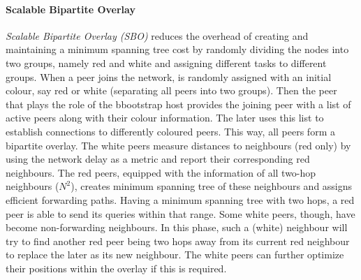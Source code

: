 %
%
%

\paragraph*{\bf Scalable Bipartite Overlay}
\emph{Scalable Bipartite Overlay (SBO)}
\cite{liu_bipartite_IPDPS,liu_bipartite_2007} reduces the overhead of
creating and maintaining a minimum spanning tree cost by randomly dividing the
nodes into two groups, namely red and white and assigning different tasks to
different groups. When a peer joins the network, is randomly assigned with an
initial colour, say red or white (separating all peers into two groups). Then
the peer that plays the role of the bbootstrap host provides the joining peer
with a list of active peers along with their colour information. The later uses
this list to establish connections to differently coloured peers. This way, all
peers form a bipartite overlay. The white peers measure distances to
neighbours (red only) by using the network delay as a metric and report their
corresponding red neighbours. The red peers, equipped with the information of
all two-hop neighbours ($N^2$), creates minimum spanning tree of these
neighbours and assigns efficient forwarding paths. Having a minimum spanning
tree with two hops, a red peer is able to send its queries within that range.
Some white peers, though, have become non-forwarding neighbours. In this phase,
such a (white) neighbour will try to find another red peer being two hops away
from its current red neighbour to replace the later as its new neighbour. The
white peers can further optimize their positions within the overlay if this is
required.

